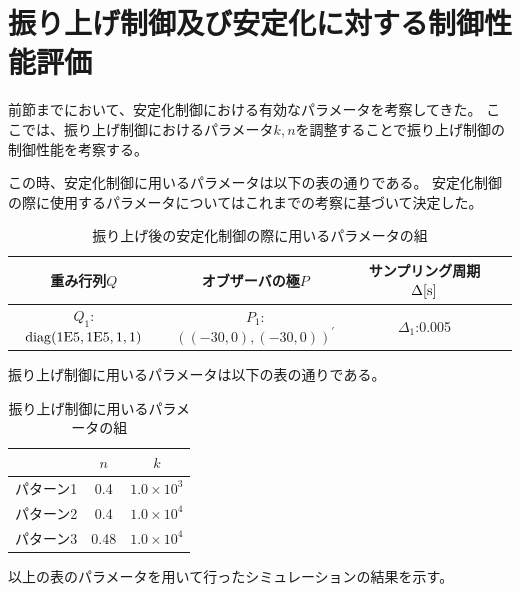 \section{振り上げ制御及び安定化に対する制御性能評価}
	前節までにおいて、安定化制御における有効なパラメータを考察してきた。
	ここでは、振り上げ制御におけるパラメータ$k,n$を調整することで振り上げ制御の制御性能を考察する。
	\par
	この時、安定化制御に用いるパラメータは以下の表の通りである。
	安定化制御の際に使用するパラメータについてはこれまでの考察に基づいて決定した。
	\begin{table}[htb]
		\begin{center}
			\caption{振り上げ後の安定化制御の際に用いるパラメータの組}
			\medskip
			
			\begin{tabular}{|c|c|c|c|}\hline
				重み行列$Q$ & オブザーバの極$P$ & サンプリング周期$\Delta[\rm{s}]$ \\ \hline\hline
				$Q_1$:$\rm{diag}(1E5,1E5,1,1)$ & $P_1$:$((-30,0),(-30,0))^{'}$ & $\Delta_1$:0.005 \\ \hline
			\end{tabular}
		\end{center}
		\label{table:huriage_control}
	\end{table}
	振り上げ制御に用いるパラメータは以下の表の通りである。
	\begin{table}[htb]
		\begin{center}
			\caption{振り上げ制御に用いるパラメータの組}
			\medskip
			
			\begin{tabular}{|c|c|c|}\hline
				& $n$ & $k$ \\ \hline\hline
				パターン1 & 0.4 & $1.0×10^3$  \\ \hline
				パターン2 & 0.4 & $1.0×10^4$  \\ \hline
				パターン3 & 0.48 & $1.0×10^4$  \\ \hline
			\end{tabular}
		\end{center}
		\label{table:huriage_huriage}
	\end{table}
	以上の表のパラメータを用いて行ったシミュレーションの結果を示す。
	
	
	
	
	
